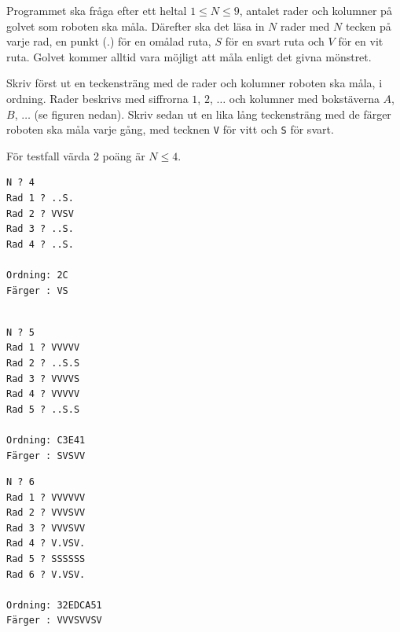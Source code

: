 Programmet ska fråga efter ett heltal $1 \leq N \leq 9$, antalet rader och kolumner på golvet som roboten ska måla. Därefter ska det läsa in $N$ rader med $N$ tecken på varje rad, en punkt ($.$) för en omålad ruta, $S$ för en svart ruta och $V$ för en vit ruta. Golvet kommer alltid vara möjligt att måla enligt det givna mönstret. 

Skriv först ut en teckensträng med de rader och kolumner roboten ska måla, i ordning.
Rader beskrivs med siffrorna $1$, $2$, $\dots$ och kolumner med bokstäverna $A$, $B$, $\dots$ (se figuren nedan). Skriv sedan ut en lika lång teckensträng med de färger roboten ska måla varje gång, med tecknen \texttt{V} för vitt och \texttt{S} för svart.

 För testfall värda 2 poäng är $N \le 4$.
\setlength\columnsep{20pt}
\begin{multicols}{3}

\begin{verbatim}
N ? 4
Rad 1 ? ..S.
Rad 2 ? VVSV
Rad 3 ? ..S.
Rad 4 ? ..S.

Ordning: 2C
Färger : VS


\end{verbatim}
\vfill
\columnbreak

\begin{verbatim}
N ? 5
Rad 1 ? VVVVV
Rad 2 ? ..S.S
Rad 3 ? VVVVS
Rad 4 ? VVVVV
Rad 5 ? ..S.S

Ordning: C3E41
Färger : SVSVV

\end{verbatim}
\vfill
\columnbreak

\begin{verbatim}
N ? 6
Rad 1 ? VVVVVV
Rad 2 ? VVVSVV
Rad 3 ? VVVSVV
Rad 4 ? V.VSV.
Rad 5 ? SSSSSS
Rad 6 ? V.VSV.

Ordning: 32EDCA51
Färger : VVVSVVSV
\end{verbatim}

\vfill
\end{multicols}
